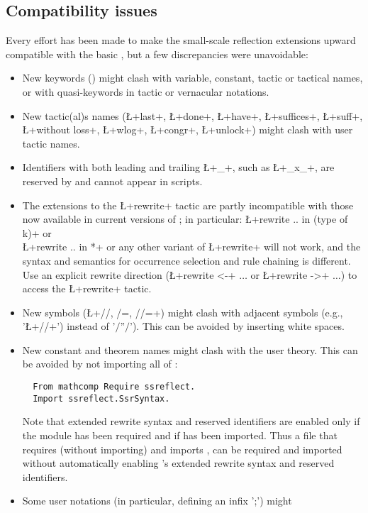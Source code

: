 \subsection{Compatibility issues}\label{sec:compat}
Every effort has been made to make the small-scale reflection
extensions upward compatible with the basic \Coq{}, but a few
discrepancies were unavoidable:
\begin{itemize}
\item New keywords () might clash with variable, constant,
tactic or tactical names, or with quasi-keywords in tactic or
vernacular notations.
\item New tactic(al)s names (\L+last+, \L+done+, \L+have+,
  \L+suffices+, \L+suff+,
  \L+without loss+, \L+wlog+, \L+congr+, \L+unlock+) might clash
  with user tactic names.
\item Identifiers with both leading and trailing \L+_+, such as \L+_x_+,
are reserved by \ssr{} and cannot appear in scripts.
\item The extensions to the \L+rewrite+ tactic are partly
incompatible with those now available in current versions of \Coq{};
in particular:
\L+rewrite .. in (type of k)+ or \\ \L+rewrite .. in *+ or any other
variant of \L+rewrite+ will not work, and the \ssr{} syntax and semantics for occurrence selection and
rule chaining is different.
Use an explicit rewrite direction (\L+rewrite <-+ $\dots$ or \L+rewrite ->+ $\dots$)
to access the \Coq{} \L+rewrite+ tactic.
\item New symbols (\L+//, /=, //=+) might clash with adjacent symbols
(e.g., '\L+//+') instead of '$/$''$/$'). This can be avoided by
inserting white spaces.
\item New constant and theorem names might clash with the user
theory. This can be avoided by not importing all of \ssr{}:
\begin{lstlisting}
  From mathcomp Require ssreflect.
  Import ssreflect.SsrSyntax.
\end{lstlisting}
Note that \ssr{} extended rewrite syntax and reserved identifiers are
enabled only if the  module has been required and if
 has been imported. Thus a file that requires (without importing)
  and imports , can be
required and imported without automatically enabling \ssr{}'s
extended rewrite syntax and reserved identifiers.
\item Some user notations (in particular, defining an infix ';') might

\end{itemize}
